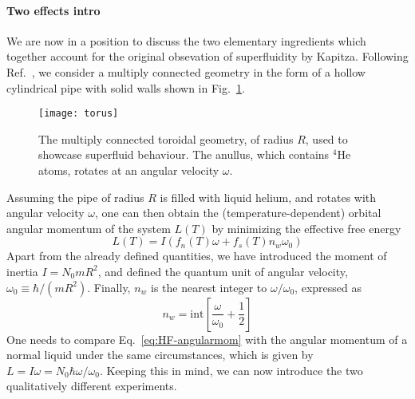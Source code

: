 \paragraph{Two effects intro}
We are now in a position to discuss the two elementary ingredients
which together account for the original obsevation of superfluidity by
Kapitza. Following Ref.~\cite{Leggett_1999}, we consider a multiply
connected geometry in the form of a hollow cylindrical pipe with solid
walls shown in Fig.~\ref{fig:torus}.
%
\begin{figure}[tb]\centering
  \texttt{[image: torus]}
  \caption{
    The multiply connected toroidal geometry, of radius $R$, used to
    showcase superfluid behaviour. The anullus, which contains ${}^4$He
    atoms, rotates at an angular velocity $\omega$.
  }\label{fig:torus}
\end{figure}
% 
Assuming the pipe of radius $R$ is filled with liquid helium, and
rotates with angular velocity $\omega$, one can then obtain the
(temperature-dependent) orbital angular momentum of the system $L(T)$
by minimizing the effective free energy~\cite{leggett2006quantum}
%
\begin{equation}\label{eq:HF-angularmom}
  L(T) = I\left(f_n(T)\omega + f_s(T)n_w\omega_0\right)
\end{equation}
% 
Apart from the already defined quantities, we have introduced the
moment of inertia $I = N_0mR^2$, and defined the quantum unit of
angular velocity, $\omega_0 \equiv \hbar/(mR^2)$. Finally, $n_w$ is the
nearest integer to $\omega/\omega_0$, expressed as
%
\begin{equation}\label{eq:nearest-integer}
  n_w = \text{int} \left[\frac{\omega}{\omega_0} + \frac{1}{2}\right]
\end{equation}
% 
One needs to compare Eq.~\eqref{eq:HF-angularmom} with the angular
momentum of a normal liquid under the same circumstances, which is
given by $L = I \omega = N_0 \hbar \omega/\omega_0$. Keeping this in
mind, we can now introduce the two qualitatively different
experiments.


